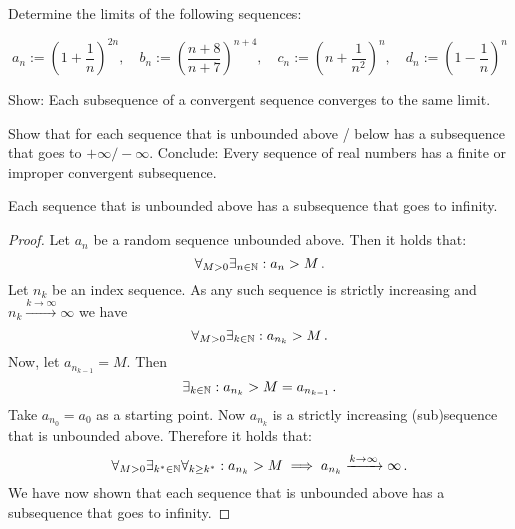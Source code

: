 \documentclass[week=4]{homework}
\date{\today}
\begin{document}
    \maketitle
    \thispagestyle{empty}
    \newpage
    \begin{questions}
		\let\firstquestion\question
		\renewcommand*{\question}{\vspace{7mm}\firstquestion}
        \firstquestion
        Determine the limits of the following sequences:
        
        \[
	        a_n := \left(1 + \frac{1}{n} \right)^{2n}, \quad b_n := \left(\frac{n+8}{n+7} \right)^{n+4}, \quad c_n := \left(n + \frac{1}{n^2} \right)^{n}, \quad d_n := \left(1 - \frac{1}{n} \right)^n
        \]
        
        \question 
        Show: Each subsequence of a convergent sequence converges to the same limit. 
        
        \question 
        Show that for each sequence that is unbounded above / below has a subsequence that goes to $+ \infty / - \infty$. Conclude: Every sequence of real numbers has a finite or improper convergent subsequence. 
        
        \begin{inlinetoprove}
        	Each sequence that is unbounded above has a subsequence that goes to infinity.
        \end{inlinetoprove}
        \begin{proof}
        	Let $a_n$ be a random sequence unbounded above. Then it holds that:
        	\[
	        	\forall_{M > 0} \exists_{n \in \mathbb{N}} : a_n > M\,.
        	\]
	        Let $n_k$ be an index sequence. As any such sequence is strictly increasing and $n_k \xrightarrow{k\to\infty} \infty$ we have
	        \[
		        \forall_{M > 0} \exists_{k \in \mathbb{N}} : a_{n_{k}} > M\,.
	        \]
	        Now, let $a_{n_{k-1}} = M$. Then
	        \[
		        \exists_{k \in \mathbb{N}} : a_{n_{k}} > M = a_{n_{k-1}}\,.
	        \]
	        Take $a_{n_0} = a_0$ as a starting point. Now $a_{n_k}$ is a strictly increasing (sub)sequence that is unbounded above. Therefore it holds that:
	        \[
		        \forall_{M > 0} \exists_{k^* \in \mathbb{N}} \forall_{k \ge k^*} : a_{n_k} > M \implies a_{n_k} \xrightarrow{k \to \infty} \infty\,.
	        \]
	        We have now shown that each sequence that is unbounded above has a subsequence that goes to infinity.
        \end{proof}
        

\end{questions}
\end{document}
